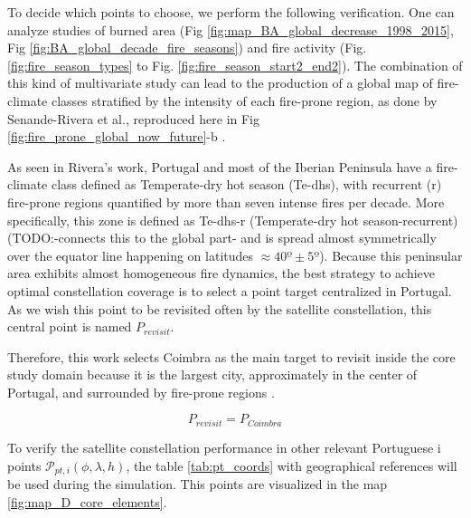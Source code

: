 To decide which points to choose, we perform the following verification. One can analyze studies of burned area (Fig \ref{fig:map_BA_global_decrease_1998_2015}, Fig \ref{fig:BA_global_decade_fire_seasons}) and fire activity (Fig.\ref{fig:fire_season_types}  to  Fig. \ref{fig:fire_season_start2_end2}). The combination of this kind of multivariate study can lead to the production of a global map of fire-climate classes stratified by the intensity of each fire-prone region, as done by Senande-Rivera et al., reproduced here in Fig  \ref{fig:fire_prone_global_now_future}-b \cite{senande-rivera_spatial_2022}. 



As seen in Rivera's work, Portugal and most of the Iberian Peninsula have a fire-climate class defined as Temperate-dry hot season (Te-dhs), with recurrent (r) fire-prone regions quantified by more than seven intense fires per decade. More specifically, this zone is defined as Te-dhs-r (Temperate-dry hot season-recurrent) (TODO:-connects this to the global part- and is spread almost symmetrically over the equator line happening on latitudes $\approx 40º \pm 5º$). Because this peninsular area exhibits almost homogeneous fire dynamics, the best strategy to achieve optimal constellation coverage is to select a point target centralized in Portugal. As we wish this point to be revisited often by the satellite constellation, this central point is named $P_{revisit}$.

Therefore, this work selects Coimbra as the main target to revisit inside the core study domain because it is the largest city, approximately in the center of Portugal, and surrounded by fire-prone regions . 

\begin{equation}

    P_{revisit} = P_{Coimbra}

\end{equation}





To verify the satellite constellation performance in other relevant Portuguese i points $\mathcal{P}_{pt,i}(\phi, \lambda, h)$, the table \ref{tab:pt_coords} with geographical references will be used during the simulation. This points are visualized in the map \ref{fig:map_D_core_elements}.



